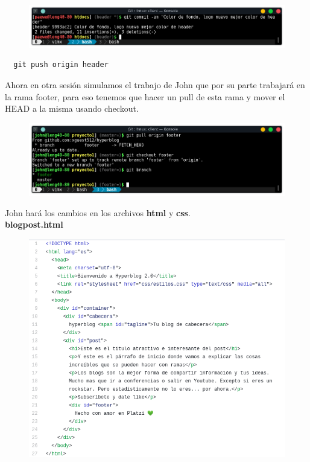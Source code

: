\documentclass{article}
\begin{document}
\begin{figure}[h!]
  \centering
  \includegraphics[scale=0.75]{./Pictures/280_commit_changes.png}
\end{figure}

\begin{verbatim}
  git push origin header
\end{verbatim}

Ahora en otra sesión simulamos el trabajo de John que por su parte trabajará en
la rama footer, para eso tenemos que hacer un pull de esta rama y mover el HEAD
a la misma usando checkout.

\begin{figure}[h!]
  \centering
  \includegraphics[scale=0.75]{./Pictures/281_john_footer.png}
\end{figure}

\newpage

John hará los cambios en los archivos \textbf{html} y \textbf{css}.\\

\textbf{blogpost.html}
\begin{figure}[h!]
  \centering
  \includegraphics[scale=0.75]{./Pictures/302_blogposthtml.png}
\end{figure}
\end{document}
